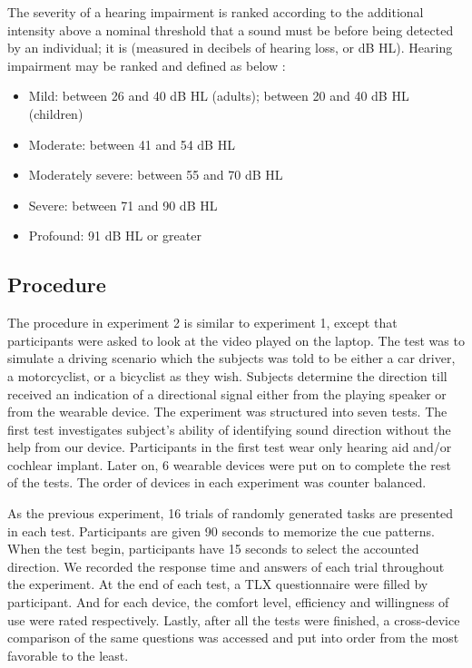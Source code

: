 \documentclass{sigchi}
\begin{document}
The severity of a hearing impairment is ranked according to the additional intensity above a nominal threshold that a sound must be before being detected by an individual; it is (measured in decibels of hearing loss, or dB HL). Hearing impairment may be ranked and defined as below \cite{Elzouki2012}:

\begin{itemize}
\item Mild: between 26 and 40 dB HL (adults); between 20 and 40 dB HL (children)
\item Moderate: between 41 and 54 dB HL
\item Moderately severe: between 55 and 70 dB HL
\item Severe: between 71 and 90 dB HL
\item Profound: 91 dB HL or greater
\end{itemize}

\subsection{Procedure}
The procedure in experiment 2 is similar to experiment 1, except that participants were asked to look at the video played on the laptop. The test was to simulate a driving scenario which the subjects was told to be either a car driver, a motorcyclist, or a bicyclist as they wish. Subjects determine the direction till received an indication of a directional signal either from the playing speaker or from the wearable device. The experiment was structured into seven tests. The first test investigates subject's ability of identifying sound direction without the help from our device. Participants in the first test wear only hearing aid and/or cochlear implant. Later on, 6 wearable devices were put on to complete the rest of the tests. The order of devices in each experiment was counter balanced.

As the previous experiment, 16 trials of randomly generated tasks are presented in each test. Participants are given 90 seconds to memorize the cue patterns. When the test begin, participants have 15 seconds to select the accounted direction. We recorded the response time and answers of each trial throughout the experiment. At the end of each test, a TLX questionnaire were filled by participant. And for each device, the comfort level, efficiency and willingness of use were rated respectively. Lastly, after all the tests were finished, a cross-device comparison of the same questions was accessed and put into order from the most favorable to the least.
\end{document}
